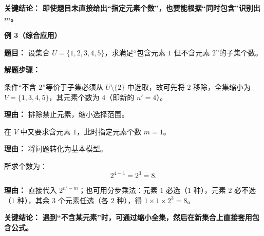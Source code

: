 \begin{examplebox}
	\textbf{\textcolor{CExample}{关键结论：}}
	\textbf{即使题目未直接给出“指定元素个数”，也要能根据“同时包含”识别出 $m$。}

	\medskip
	\textbf{\textcolor{CExample}{例 3（综合应用）}}

	\textbf{\textcolor{CExample}{题目：}}
	设集合 $U = \{1,2,3,4,5\}$，求满足“包含元素 $1$ 但不含元素 $2$”的子集个数。

	\textbf{\textcolor{CExample}{解题步骤：}}
	\begin{description}[style=nextline, leftmargin=2.8em, labelsep=0.5em, itemsep=0.45em]
		\item[\textbf{第一步（条件转化）：}] 条件“不含 $2$”等价于子集必须从 $U \setminus \{2\}$ 中选取，故可先将 $2$ 移除，全集缩小为 $V = \{1,3,4,5\}$，其元素个数为 $4$（即新的 $n'=4$）。
			\par\textbf{理由：} 排除禁止元素，缩小选择范围。

		\item[\textbf{第二步（应用包含公式）：}] 在 $V$ 中又要求含元素 $1$，此时指定元素个数 $m=1$。
			\par\textbf{理由：} 将问题转化为基本模型。

		\item[\textbf{第三步（计算）：}] 所求个数为：
			\[
				2^{4-1} = 2^3 = 8.
			\]
			\par\textbf{理由：} 直接代入 $2^{n'-m}$；也可用分步乘法：元素 $1$ 必选（$1$ 种），元素 $2$ 必不选（$1$ 种），其余 $3$ 个元素任选（各 $2$ 种），得 $1 \times 1 \times 2^3 = 8$。
	\end{description}

	\textbf{\textcolor{CExample}{关键结论：}}
	\textbf{遇到“不含某元素”时，可通过缩小全集，然后在新集合上直接套用包含公式。}
\end{examplebox}
